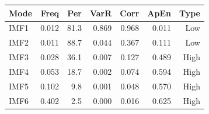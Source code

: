 {\tiny\setlength{\tabcolsep}{1pt}\begin{tabular}{lrrrrrr} \toprule
Mode & Freq & Per & VarR & Corr & ApEn & Type \\ \midrule
IMF1 & 0.012 & 81.3 & 0.869 & 0.968 & 0.011 & Low \\ 
IMF2 & 0.011 & 88.7 & 0.044 & 0.367 & 0.111 & Low \\ 
IMF3 & 0.028 & 36.1 & 0.007 & 0.127 & 0.489 & High \\ 
IMF4 & 0.053 & 18.7 & 0.002 & 0.074 & 0.594 & High \\ 
IMF5 & 0.102 & 9.8 & 0.001 & 0.048 & 0.570 & High \\ 
IMF6 & 0.402 & 2.5 & 0.000 & 0.016 & 0.625 & High \\ 
\bottomrule \end{tabular}}